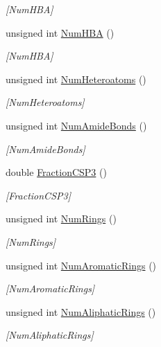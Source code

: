 \begin{DoxyCompactItemize}
\begin{DoxyCompactList}\small\item\em \mbox{[}Num\+H\+BA\mbox{]} \end{DoxyCompactList}\item 
unsigned int \mbox{\hyperlink{class_molecule_a932d2464d1d351fca8e72cd160bde74f}{Num\+H\+BA}} ()
\begin{DoxyCompactList}\small\item\em \mbox{[}Num\+H\+BA\mbox{]} \end{DoxyCompactList}\item 
unsigned int \mbox{\hyperlink{class_molecule_a582058277ae6808a93cf6ef186037eaa}{Num\+Heteroatoms}} ()
\begin{DoxyCompactList}\small\item\em \mbox{[}Num\+Heteroatoms\mbox{]} \end{DoxyCompactList}\item 
unsigned int \mbox{\hyperlink{class_molecule_a48326bca7f346cee15f4c6f251ba8788}{Num\+Amide\+Bonds}} ()
\begin{DoxyCompactList}\small\item\em \mbox{[}Num\+Amide\+Bonds\mbox{]} \end{DoxyCompactList}\item 
double \mbox{\hyperlink{class_molecule_a9fe4d5adae1305a7eeb0a7f4a7b5bcad}{Fraction\+C\+S\+P3}} ()
\begin{DoxyCompactList}\small\item\em \mbox{[}Fraction\+C\+S\+P3\mbox{]} \end{DoxyCompactList}\item 
unsigned int \mbox{\hyperlink{class_molecule_a0a3b03a9c5fcc9d24f2f285fdb68361a}{Num\+Rings}} ()
\begin{DoxyCompactList}\small\item\em \mbox{[}Num\+Rings\mbox{]} \end{DoxyCompactList}\item 
unsigned int \mbox{\hyperlink{class_molecule_a76554ff4fee44adcd1a1ca15eb8e8a7b}{Num\+Aromatic\+Rings}} ()
\begin{DoxyCompactList}\small\item\em \mbox{[}Num\+Aromatic\+Rings\mbox{]} \end{DoxyCompactList}\item 
unsigned int \mbox{\hyperlink{class_molecule_a6170e58d6f19e2023378975bcf93c8d7}{Num\+Aliphatic\+Rings}} ()
\begin{DoxyCompactList}\small\item\em \mbox{[}Num\+Aliphatic\+Rings\mbox{]} \end{DoxyCompactList}\item 

\end{DoxyCompactItemize}
